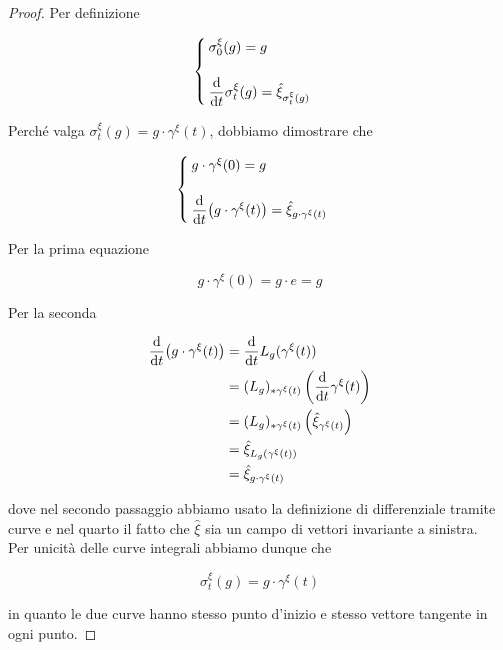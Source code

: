 \begin{proof}
	Per definizione
	
	\begin{equation}
		\begin{cases}
			\sigma_{0}^{\xi}(g) = g \\\\
			\ddv{t} \sigma_{t}^{\xi}(g) = \hat{\xi}_{\sigma_{t}^{\xi}(g)}
		\end{cases}
	\end{equation}

	Perché valga $ \sigma_{t}^{\xi}(g) = g \cdot \gamma^{\xi}(t) $, dobbiamo dimostrare che
	
	\begin{equation}
		\begin{cases}
			g \cdot \gamma^{\xi}(0) = g \\\\
			\ddv{t} (g \cdot \gamma^{\xi}(t)) = \hat{\xi}_{g \cdot \gamma^{\xi}(t)}
		\end{cases}
	\end{equation}

	Per la prima equazione
	
	\begin{equation}
		g \cdot \gamma^{\xi}(0) = g \cdot e = g
	\end{equation}

	Per la seconda
	
	\begin{align}
		\begin{split}
			\dv{t} (g \cdot \gamma^{\xi}(t)) &= \dv{t} L_{g}(\gamma^{\xi}(t)) \\
			&= (L_{g})_{*\gamma^{\xi}(t)} \left( \dv{t} \gamma^{\xi}(t) \right) \\
			&= (L_{g})_{*\gamma^{\xi}(t)} \left( \hat{\xi}_{\gamma^{\xi}(t)} \right) \\
			&= \hat{\xi}_{L_{g}(\gamma^{\xi}(t))} \\
			&= \hat{\xi}_{g \cdot \gamma^{\xi}(t)}
		\end{split}
	\end{align}

	dove nel secondo passaggio abbiamo usato la definizione di differenziale tramite curve e nel quarto il fatto che $ \hat{\xi} $ sia un campo di vettori invariante a sinistra.\\
	Per unicità delle curve integrali abbiamo dunque che
	
	\begin{equation}
		\sigma_{t}^{\xi}(g) = g \cdot \gamma^{\xi}(t)
	\end{equation}

	in quanto le due curve hanno stesso punto d'inizio e stesso vettore tangente in ogni punto.
\end{proof}

